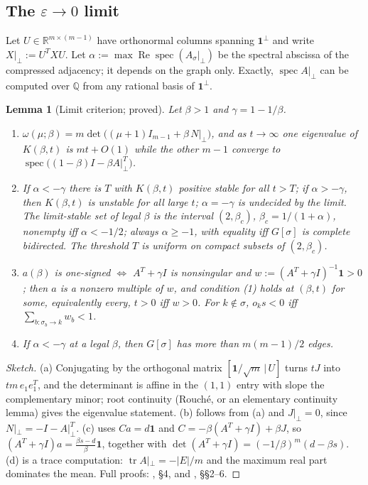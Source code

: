 \documentclass[11pt]{article}
\newtheorem{lemma}[theorem]{Lemma}
\theoremstyle{definition}
\newcommand{\R}{\mathbb{R}}
\newcommand{\Q}{\mathbb{Q}}
\newcommand{\one}{\mathbf{1}}
\newcommand{\eps}{\varepsilon}
\newcommand{\perpc}[1]{#1|_{\perp}}
\newcommand{\spec}{\operatorname{spec}}
\newcommand{\Rea}{\operatorname{Re}}
\begin{document}
\subsection{The \texorpdfstring{$\eps\to0$}{eps -> 0} limit}
Let $U\in\R^{m\times(m-1)}$ have orthonormal columns spanning $\one^\perp$ and write
$\perpc{X}:=U^TXU$. Let $\alpha:=\max\Rea\spec(\perpc{A_\sigma})$ be the spectral abscissa of the
compressed adjacency; it depends on the graph only. Exactly, $\spec\perpc{A}$ can be computed over $\Q$
from any rational basis of $\one^\perp$.

\begin{lemma}[Limit criterion; proved]\label{lem:limit}
Let $\beta>1$ and $\gamma=1-1/\beta$.
\begin{enumerate}
\item[(a)] $\omega(\mu;\beta)=m\det\bigl((\mu+1)I_{m-1}+\beta\,\perpc{N}\bigr)$, and as $t\to\infty$ one eigenvalue
of $K(\beta,t)$ is $mt+O(1)$ while the other $m-1$ converge to $\spec\bigl((1-\beta)I-\beta\perpc{A}^T\bigr)$.
\item[(b)] If $\alpha<-\gamma$ there is $T$ with $K(\beta,t)$ positive stable for all $t>T$; if
$\alpha>-\gamma$, then $K(\beta,t)$ is unstable for all large $t$; $\alpha=-\gamma$ is undecided by the limit.
The limit-stable set of legal $\beta$ is the interval $(2,\beta_c)$, $\beta_c=1/(1+\alpha)$, nonempty iff
$\alpha<-1/2$; always $\alpha\ge-1$, with equality iff $G[\sigma]$ is complete bidirected. The threshold $T$ is
uniform on compact subsets of $(2,\beta_c)$.
\item[(c)] $a(\beta)$ is one-signed $\iff$ $A^T+\gamma I$ is nonsingular and $w:=(A^T+\gamma I)^{-1}\one>0$; then $a$ is a
nonzero multiple of $w$, and condition (1) holds at $(\beta,t)$ for some, equivalently every, $t>0$ iff $w>0$. For $k\notin\sigma$,
$o_ks<0$ iff $\sum_{b:\sigma_b\to k}w_b<1$.
\item[(d)] If $\alpha<-\gamma$ at a legal $\beta$, then $G[\sigma]$ has more than $m(m-1)/2$ edges.
\end{enumerate}
\end{lemma}
\begin{proof}[Sketch]
(a) Conjugating by the orthogonal matrix $[\one/\sqrt m\,|\,U]$ turns $tJ$ into $tm\,e_1e_1^T$, and the
determinant is affine in the $(1,1)$ entry with slope the complementary minor; root continuity (Rouch\'e,
or an elementary continuity lemma) gives the eigenvalue statement. (b) follows from (a) and
$\perpc{J}=0$, since $\perpc{N}=-I-\perpc{A}^T$. (c) uses $Ca=d\one$ and $C=-\beta(A^T+\gamma I)+\beta J$, so
$(A^T+\gamma I)a=\frac{\beta s-d}{\beta}\one$, together with $\det(A^T+\gamma I)=(-1/\beta)^m(d-\beta s)$. (d) is
a trace computation: $\operatorname{tr}\perpc{A}=-|E|/m$ and the maximum real part dominates the mean.
Full proofs: , \S4, and , \S\S2--6.
\end{proof}
\end{document}
